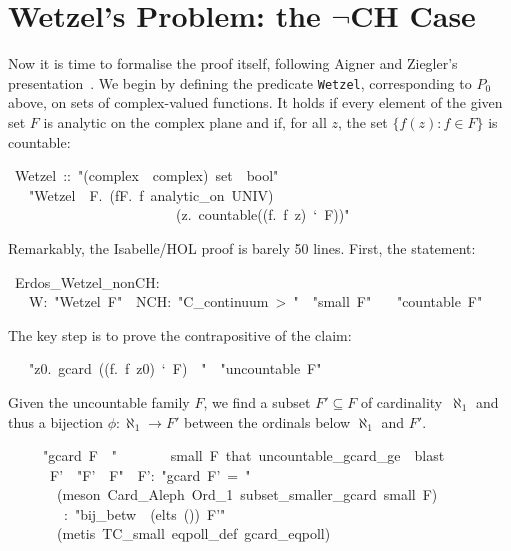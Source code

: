 \documentclass[runningheads]{llncs}
\begin{document}
\section{Wetzel's Problem: the $\neg$CH Case}

Now it is time to formalise the proof itself, following Aigner and Ziegler's presentation~\cite{aigner-proofs}.
We begin by defining the predicate \texttt{Wetzel}, corresponding to $P_0$ above, on sets of complex-valued functions. It holds if every element of the given set $F$ is analytic on the complex plane and if, for all $z$, the set $\{f(z) : f\in F\}$ is countable:
\begin{isabelle}
\ Wetzel\ ::\ "(complex\ \isasymRightarrow \ complex)\ set\ \isasymRightarrow \ bool"\isanewline
\ \ \ "Wetzel\ \isasymequiv \ \isasymlambda F.\ (\isasymforall f\isasymin F.\ f\ analytic\_on\ UNIV)\ \isasymand\isanewline
\ \ \ \ \ \ \ \ \ \ \ \ \ \ \ \ \ \ \ \ \ \ \ \ (\isasymforall z.\ countable((\isasymlambda f.\ f\ z)\ `\ F))"
\end{isabelle}

Remarkably, the Isabelle/HOL proof is barely 50 lines. First, the statement:
\begin{isabelle}
\ Erdos\_Wetzel\_nonCH:\isanewline
\ \ \ W:\ "Wetzel\ F"\ \ NCH:\ "C\_continuum\ >\ "\ \ "small\ F"\isanewline
\ \ \ "countable\ F"
\end{isabelle}

The key step is to prove the contrapositive of the claim:
\begin{isabelle}
\ \ \ "\isasymexists z0.\ gcard\ ((\isasymlambda f.\ f\ z0)\ `\ F)\ \isasymge \ "\ \ "uncountable\ F"
\end{isabelle}

\noindent
Given the uncountable family $F$, we find a subset $F'\subseteq F$ of cardinality~$\aleph_1$  and thus a bijection $\phi:\aleph_1\to F'$  between the ordinals below $\aleph_1$ and $F'$.
\begin{isabelle}
\ \ \ \ \ "gcard\ F\ \isasymge \ "\isanewline
\ \ \ \ \ \ \ \isacartoucheopen small\ F\isacartoucheclose \ that\ uncountable\_gcard\_ge\ \ blast\ \isanewline
\ \ \ \ \ \ F'\ \ "F'\ \isasymsubseteq \ F"\ \ F':\ "gcard\ F'\ =\ "\isanewline
\ \ \ \ \ \ \ (meson\ Card\_Aleph\ Ord\_1\ subset\_smaller\_gcard\ \isacartoucheopen small\ F\isacartoucheclose )\isanewline
\ \ \ \ \ \ \isasymphi \ \ \isasymphi :\ "bij\_betw\ \isasymphi \ (elts\ ())\ F'"\isanewline
\ \ \ \ \ \ \ (metis\ TC\_small\ eqpoll\_def\ gcard\_eqpoll)
\end{isabelle}
\end{document}
